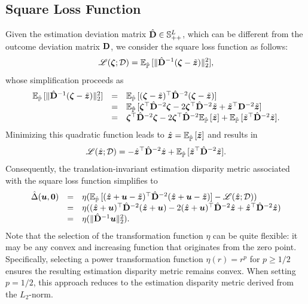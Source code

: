\documentclass[mnsc, nonblindrev]{informswp}
\newcommand{\1}[1]{\mathds{1}{\left(#1\right)}}
\begin{document}
\subsection*{Square Loss Function}
Given the estimation deviation matrix ${\hat{\mathbf{D}}} \in \mathbb{S}^L_{++}$, which can be different from the outcome deviation matrix ${\mathbf{D}}$, we consider the square loss function as follows:
$$
\mathscr{L}(\bm{\zeta}; \mathcal{D}) = \mathbb{E}_{\hat{\mathbb{P}}}\,[\|{\hat{\mathbf{D}}}^{-1}(\bm{\zeta} - \tilde{\bm{z}})\|^2_2],
$$
whose simplification proceeds as
$$
\begin{array}{rcl}
\mathbb{E}_{\hat{\mathbb{P}}}\,[\|{\hat{\mathbf{D}}}^{-1}(\bm{\zeta} - \tilde{\bm{z}})\|^2_2] &=& \mathbb{E}_{\hat{\mathbb{P}}}\,[(\bm{\zeta} - \tilde{\bm{z}})^\top {\hat{\mathbf{D}}}^{-2}(\bm{\zeta} - \tilde{\bm{z}})] \\
&=& \mathbb{E}_{\hat{\mathbb{P}}}\,[\bm{\zeta}^\top {\hat{\mathbf{D}}}^{-2} \bm{\zeta} - 2 \bm{\zeta}^\top {\hat{\mathbf{D}}}^{-2} \tilde{\bm{z}} + \tilde{\bm{z}}^\top {\mathbf{D}}^{-2} \tilde{\bm{z}}] \\
&=& \bm{\zeta}^\top {\hat{\mathbf{D}}}^{-2} \bm{\zeta} - 2\bm{\zeta}^\top {\hat{\mathbf{D}}}^{-2} \mathbb{E}_{\hat{\mathbb{P}}}\,[\tilde{\bm{z}}] + \mathbb{E}_{\hat{\mathbb{P}}}\,[\tilde{\bm{z}}^\top  {\hat{\mathbf{D}}}^{-2} \tilde{\bm{z}}].
\end{array}
$$
Minimizing this quadratic function leads to $\hat{\bm{z}} = \mathbb{E}_{\hat{\mathbb{P}}}\,[\tilde{\bm{z}}]$ and results in
$$
\mathscr{L}(\hat{\bm{z}}; \mathcal{D}) = -\hat{\bm{z}}^\top {\hat{\mathbf{D}}}^{-2} \hat{\bm{z}} + \mathbb{E}_{\hat{\mathbb{P}}}\,[\tilde{\bm{z}}^\top  {\hat{\mathbf{D}}}^{-2}\tilde{\bm{z}}].
$$
Consequently, the translation-invariant estimation disparity metric associated with the square loss function simplifies to
$$
\begin{array}{rcl}
\hat \Delta(\bm u,\bm 0) &=& \eta (\mathbb{E}_{\hat{\mathbb{P}}}\,[(\hat{\bm{z}} + \bm u - \tilde{\bm{z}})^\top {\hat{\mathbf{D}}}^{-2}(\hat{\bm{z}} + \bm u- \tilde{\bm{z}})] - \mathscr{L}(\hat{\bm{z}}; \mathcal{D})) \\
&=& \eta ((\hat{\bm{z}} + \bm{u})^\top {\hat{\mathbf{D}}}^{-2} (\hat{\bm{z}} + \bm u) - 2(\hat{\bm{z}} + \bm{u})^\top {\hat{\mathbf{D}}}^{-2} \hat{\bm{z}} + \hat{\bm{z}}^\top {\hat{\mathbf{D}}}^{-2} \hat{\bm{z}}) \\
&=& \eta(\|{\hat{\mathbf{D}}}^{-1} \bm u\|^2_2). 
\end{array}
$$
Note that the selection of the transformation function $\eta$ can be quite flexible: it may be any convex and increasing function that originates from the zero point. Specifically, selecting a power transformation function $\eta(r) = r^p$ for $p \geq 1/2$ ensures the resulting estimation disparity metric remains convex. When setting $p = 1/2$, this approach reduces to the estimation disparity metric derived from the $L_2$-norm. 
\end{document}
